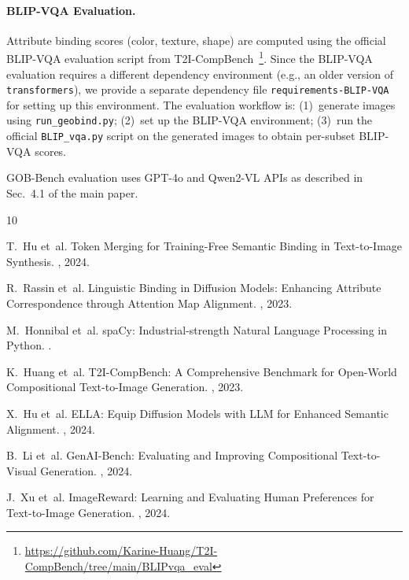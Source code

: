 \documentclass[sigconf,nonacm]{acmart}
\begin{document}
\paragraph{BLIP-VQA Evaluation.}
Attribute binding scores (color, texture, shape) are computed using the official BLIP-VQA evaluation script from T2I-CompBench~\cite{huang2023t2icompbench}\footnote{\url{https://github.com/Karine-Huang/T2I-CompBench/tree/main/BLIPvqa_eval}}. Since the BLIP-VQA evaluation requires a different dependency environment (e.g., an older version of \texttt{transformers}), we provide a separate dependency file \texttt{requirements-BLIP-VQA} for setting up this environment. The evaluation workflow is: (1)~generate images using \texttt{run\_geobind.py}; (2)~set up the BLIP-VQA environment; (3)~run the official \texttt{BLIP\_vqa.py} script on the generated images to obtain per-subset BLIP-VQA scores.

GOB-Bench evaluation uses GPT-4o and Qwen2-VL APIs as described in Sec.~4.1 of the main paper.




\begin{thebibliography}{10}

T.~Hu et~al.
\newblock Token Merging for Training-Free Semantic Binding in Text-to-Image Synthesis.
, 2024.

R.~Rassin et~al.
\newblock Linguistic Binding in Diffusion Models: Enhancing Attribute Correspondence through Attention Map Alignment.
, 2023.

M.~Honnibal et~al.
\newblock spaCy: Industrial-strength Natural Language Processing in Python.
.

K.~Huang et~al.
\newblock T2I-CompBench: A Comprehensive Benchmark for Open-World Compositional Text-to-Image Generation.
, 2023.

X.~Hu et~al.
\newblock ELLA: Equip Diffusion Models with LLM for Enhanced Semantic Alignment.
, 2024.

B.~Li et~al.
\newblock GenAI-Bench: Evaluating and Improving Compositional Text-to-Visual Generation.
, 2024.

J.~Xu et~al.
\newblock ImageReward: Learning and Evaluating Human Preferences for Text-to-Image Generation.
, 2024.

\end{thebibliography}
\end{document}
